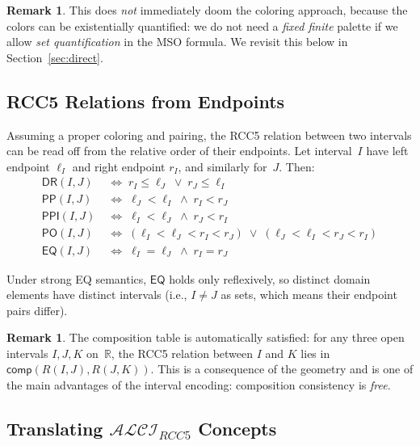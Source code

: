 \documentclass[a4paper,11pt]{article}
\theoremstyle{definition}
\newtheorem{remark}[theorem]{Remark}
\newcommand{\ALCIRCC}[1]{\ensuremath{\mathcal{ALCI}_{\mathit{RCC#1}}}}
\newcommand{\DR}{\ensuremath{\mathsf{DR}}}
\newcommand{\PO}{\ensuremath{\mathsf{PO}}}
\newcommand{\EQ}{\ensuremath{\mathsf{EQ}}}
\newcommand{\PP}{\ensuremath{\mathsf{PP}}}
\newcommand{\PPI}{\ensuremath{\mathsf{PPI}}}
\newcommand{\comp}{\ensuremath{\mathsf{comp}}}
\newcommand{\reals}{\ensuremath{\mathbb{R}}}
\begin{document}
\begin{remark}
This does \emph{not} immediately doom the coloring approach, because
the colors can be existentially quantified: we do not need a
\emph{fixed finite} palette if we allow \emph{set quantification} in
the MSO formula.  We revisit this below in
Section~\ref{sec:direct}.
\end{remark}

\subsection{RCC5 Relations from Endpoints}
\label{sec:rcc5-from-endpoints}

Assuming a proper coloring and pairing, the RCC5 relation between
two intervals can be read off from the relative order of their
endpoints.  Let interval~$I$ have left endpoint $\ell_I$ and right
endpoint $r_I$, and similarly for~$J$.  Then:
\begin{align}
  \DR(I,J) &\;\iff\; r_I \leq \ell_J \;\lor\; r_J \leq \ell_I
    \label{eq:dr} \\
  \PP(I,J) &\;\iff\; \ell_J < \ell_I \;\land\; r_I < r_J
    \label{eq:pp} \\
  \PPI(I,J) &\;\iff\; \ell_I < \ell_J \;\land\; r_J < r_I
    \label{eq:ppi} \\
  \PO(I,J) &\;\iff\; (\ell_I < \ell_J < r_I < r_J) \;\lor\;
    (\ell_J < \ell_I < r_J < r_I) \label{eq:po} \\
  \EQ(I,J) &\;\iff\; \ell_I = \ell_J \;\land\; r_I = r_J
    \label{eq:eq}
\end{align}

Under strong EQ semantics, $\EQ$ holds only reflexively, so distinct
domain elements have distinct intervals (i.e., $I \neq J$ as sets,
which means their endpoint pairs differ).

\begin{remark}
The composition table is automatically satisfied: for any three
open intervals $I, J, K$ on~$\reals$, the RCC5 relation between
$I$ and $K$ lies in $\comp(R(I,J), R(J,K))$.  This is a
consequence of the geometry and is one of the main advantages of
the interval encoding: composition consistency is \emph{free}.
\end{remark}

\subsection{Translating $\ALCIRCC{5}$ Concepts}
\label{sec:translation}
\end{document}
